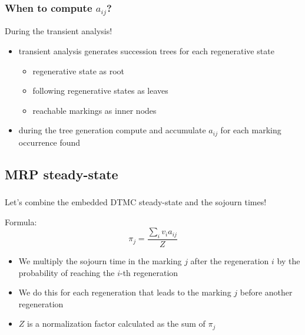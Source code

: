\begin{frame}
  \frametitle{When to compute $a_{ij}$?}
  \alert{During} the transient analysis!
  \pause
  \begin{itemize}
  \item transient analysis generates \alert{succession trees} for each
    regenerative state
    \pause
    \begin{itemize}
    \item regenerative state as \alert{root}
    \item following regenerative states as \alert{leaves}
    \item reachable markings as inner \alert{nodes}
      \pause
    \end{itemize}
  \item during the \alert{tree generation} compute and accumulate $a_{ij}$ for
    each marking occurrence found
  \end{itemize}
\end{frame}
\subsection{\acf{MRP} steady-state}
\begin{frame}
  \frametitle{\insertsubsection}
  Let's \alert{combine} the embedded \acs{DTMC} steady-state and the sojourn
  times!
  \pause
  \begin{center}
    \begin{minipage}{4cm}
      \begin{block}{Formula:}
        \begin{equation*}
          \pi_j = \frac{\sum_i v_i a_{ij}}{Z}
        \end{equation*}
      \end{block}
    \end{minipage}
  \end{center}
  \pause
  \begin{itemize}
  \item We \alert{multiply} the \alert{sojourn} time in the marking \alert{$j$} after the
    regeneration \alert{$i$} by the \alert{probability} of reaching the \alert{$i$}-th regeneration
    \pause
  \item We do this for \alert{each} regeneration that \alert{leads} to the marking \alert{$j$}
    before another regeneration
    \pause
  \item \alert{$Z$} is a \alert{normalization} factor calculated as the sum of \alert{$\pi_j$}
  \end{itemize}
\end{frame}
